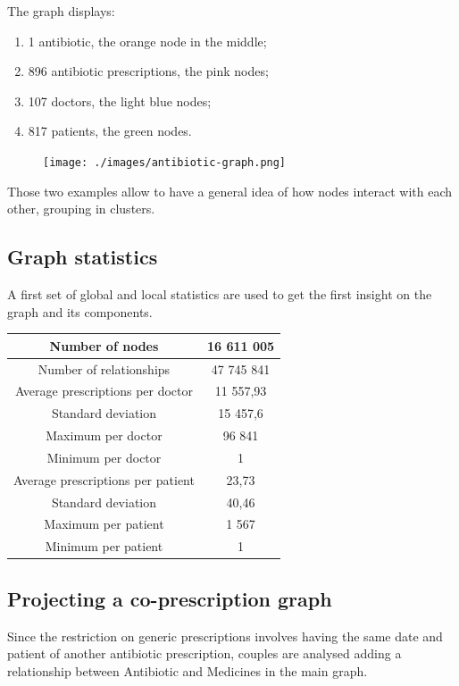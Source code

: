 The graph displays:
\begin{enumerate}
	\item 1 antibiotic, the orange node in the middle;
	\item 896 antibiotic prescriptions, the pink nodes;
	\item 107 doctors, the light blue nodes;
	\item 817 patients, the green nodes.
\end{enumerate}

\begin{figure}[h]
	\centering
	\texttt{[image: ./images/antibiotic-graph.png]}
\end{figure}

Those two examples allow to have a general idea of how nodes interact with each other, grouping in clusters. 

\subsection{Graph statistics}
A first set of global and local statistics are used to get the first insight on the graph and its components.

\begin{center}
	\begin{tabular}{c|c}
		Number of nodes & 16 611 005 \\
		\hline
		Number of relationships & 47 745 841 \\
		\hline
		Average prescriptions per doctor & 11 557,93 \\
		\hline
		Standard deviation & 15 457,6 \\
		\hline
		Maximum per doctor & 96 841 \\
		\hline
		Minimum per doctor & 1 \\
		\hline
		Average prescriptions per patient & 23,73 \\
		\hline
		Standard deviation & 40,46 \\
		\hline
		Maximum per patient & 1 567 \\
		\hline
		Minimum per patient & 1
	\end{tabular}
\end{center}

\subsection{Projecting a co-prescription graph}
Since the restriction on generic prescriptions involves having the same date and patient of another antibiotic prescription, couples are analysed adding a relationship between Antibiotic and Medicines in the main graph.

